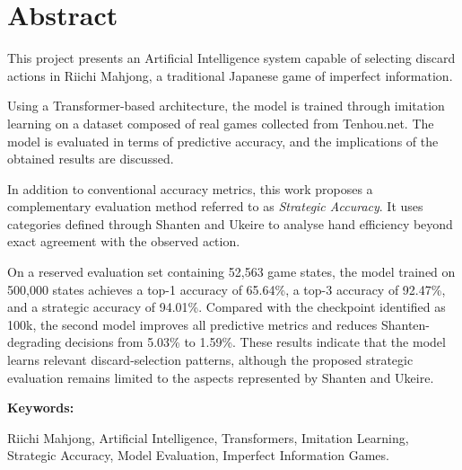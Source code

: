\section*{Abstract}

This project presents an Artificial Intelligence system capable of selecting discard actions in Riichi Mahjong, a traditional Japanese game of imperfect information.

Using a Transformer-based architecture, the model is trained through imitation learning on a dataset composed of real games collected from Tenhou.net. The model is evaluated in terms of predictive accuracy, and the implications of the obtained results are discussed.

In addition to conventional accuracy metrics, this work proposes a complementary evaluation method referred to as \textit{Strategic Accuracy}. It uses categories defined through Shanten and Ukeire to analyse hand efficiency beyond exact agreement with the observed action.

On a reserved evaluation set containing 52,563 game states, the model trained on 500,000 states achieves a top-1 accuracy of 65.64\%, a top-3 accuracy of 92.47\%, and a strategic accuracy of 94.01\%. Compared with the checkpoint identified as 100k, the second model improves all predictive metrics and reduces Shanten-degrading decisions from 5.03\% to 1.59\%. These results indicate that the model learns relevant discard-selection patterns, although the proposed strategic evaluation remains limited to the aspects represented by Shanten and Ukeire.

\vspace{0.5cm}

\textbf{Keywords:}

Riichi Mahjong,
Artificial Intelligence,
Transformers,
Imitation Learning,
Strategic Accuracy,
Model Evaluation,
Imperfect Information Games.
